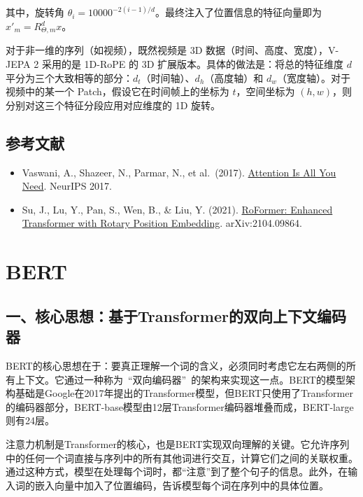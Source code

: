 其中，旋转角 \(\theta_i=10000^{-2(i-1)/d}\)。最终注入了位置信息的特征向量即为 \(x'_m=R_{\Theta,m}^{d}x\)。

对于非一维的序列（如视频），既然视频是 3D 数据（时间、高度、宽度），V-JEPA 2 采用的是 1D-RoPE 的 3D 扩展版本。具体的做法是：将总的特征维度 \(d\) 平分为三个大致相等的部分：\(d_t\)（时间轴）、\(d_h\)（高度轴）和 \(d_w\)（宽度轴）。对于视频中的某一个 Patch，假设它在时间帧上的坐标为 \(t\)，空间坐标为 \((h,w)\)，则分别对这三个特征分段应用对应维度的 1D 旋转。

\hypertarget{ux53c2ux8003ux6587ux732e-69}{%
\subsection{参考文献}\label{ux53c2ux8003ux6587ux732e-69}}

\begin{itemize}
\tightlist
\item
  Vaswani, A., Shazeer, N., Parmar, N., et al.~(2017). \href{https://arxiv.org/abs/1706.03762}{Attention Is All You Need}. NeurIPS 2017.
\item
  Su, J., Lu, Y., Pan, S., Wen, B., \& Liu, Y. (2021). \href{https://arxiv.org/abs/2104.09864}{RoFormer: Enhanced Transformer with Rotary Position Embedding}. arXiv:2104.09864.
\end{itemize}

\clearpage

\hypertarget{bert}{%
\section{BERT}\label{bert}}

\hypertarget{ux4e00ux6838ux5fc3ux601dux60f3ux57faux4e8etransformerux7684ux53ccux5411ux4e0aux4e0bux6587ux7f16ux7801ux5668}{%
\subsection{一、核心思想：基于Transformer的双向上下文编码器}\label{ux4e00ux6838ux5fc3ux601dux60f3ux57faux4e8etransformerux7684ux53ccux5411ux4e0aux4e0bux6587ux7f16ux7801ux5668}}

BERT的核心思想在于：要真正理解一个词的含义，必须同时考虑它左右两侧的所有上下文。它通过一种称为~``双向编码器''~的架构来实现这一点。BERT的模型架构基础是Google在2017年提出的Transformer模型，但BERT只使用了Transformer的编码器部分，BERT-base模型由12层Transformer编码器堆叠而成，BERT-large则有24层。

注意力机制是Transformer的核心，也是BERT实现双向理解的关键。它允许序列中的任何一个词直接与序列中的所有其他词进行交互，计算它们之间的关联权重。通过这种方式，模型在处理每个词时，都``注意''到了整个句子的信息。此外，在输入词的嵌入向量中加入了位置编码，告诉模型每个词在序列中的具体位置。

